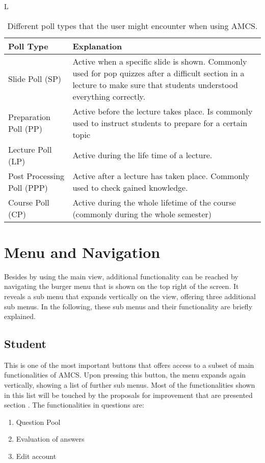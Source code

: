 \begin{table}[t]
	{\renewcommand{\arraystretch}{2}L
		\begin{tabular}{ | p{3cm} | p{12cm} |}
			\hline
			Poll Type & Explanation \\ \hline \hline
			Slide Poll (SP) & Active when a specific slide is shown. Commonly used for pop quizzes after a difficult section in a lecture to make sure that students understood everything correctly. \\ \hline
			Preparation Poll (PP) & Active before the lecture takes place. Is commonly used to instruct students to prepare for a certain topic \\ \hline
			Lecture Poll (LP) & Active during the life time of a lecture. \\ \hline
			Post Processing Poll (PPP) & Active after a lecture has taken place. Commonly used to check gained knowledge. \\ \hline
			Course Poll (CP) & Active during the whole lifetime of the course (commonly during the whole semester) \\
			\hline
		\end{tabular}
	}
	\caption{Different poll types that the user might encounter when using AMCS.}
	\label{tab:pollTypes}
\end{table}

\section{Menu and Navigation}
Besides by using the main view, additional functionality can be reached by navigating the burger menu that is shown on the top right of the screen. It reveals a sub menu that expands vertically on the view, offering three additional sub menus. In the following, these sub menus and their functionality are briefly explained.


\subsection{Student}

This is one of the most important buttons that offers access to a subset of main functionalities of AMCS. Upon pressing this button, the menu expands again vertically, showing a list of further sub menus. Most of the functionalities shown in this list will be touched by the proposals for improvement that are presented section \todosct. The functionalities in questions are:

\begin{enumerate}
	\item Question Pool
	\item Evaluation of answers
	\item Edit account
\end{enumerate}


